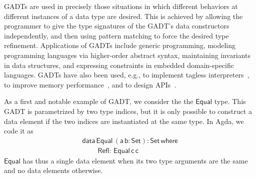\documentclass[acmsmall,screen,review,anonymous]{acmart}
\theoremstyle{definition}
\begin{document}
GADTs are used in precisely those situations in which different
behaviors at different instances of a data type are desired. This is
achieved by allowing the programmer to give the type signatures of the
GADT's data constructors independently, and then using pattern
matching to force the desired type refinement. Applications of GADTs
include generic programming, modeling programming languages via
higher-order abstract syntax, maintaining invariants in data
structures, and expressing constraints in embedded domain-specific
languages. GADTs have also been used, e.g., to implement tagless
interpreters~\cite{pl04,pr06,pvww06}, to improve memory
performance~\cite{min15}, and to design APIs~\cite{pen20}.




As a first and notable example of GADT, we consider the the $\mathsf{Equal}$ type.
This GADT is parametrized by two type indices,
but it is only possible to construct a data element if the two indices are instantiated at the same type.
In Agda, we code it as
\begin{equation}\label{eq:equal}
\begin{array}{l}
\mathsf{data\, Equal\,(a\,b : Set) : Set\,where}\\
\mathsf{\;\;\;\;\;\;\;\;Refl :\, Equal\,c\,c}
\end{array}
\end{equation}
$\mathsf{Equal}$ has thus a single data element when its two type arguments
are the same and no data elements otherwise.
\end{document}
